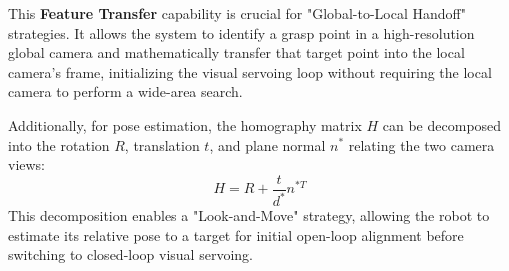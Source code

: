 This \textbf{Feature Transfer} capability is crucial for "Global-to-Local Handoff" strategies. It allows the system to identify a grasp point in a high-resolution global camera and mathematically transfer that target point into the local camera's frame, initializing the visual servoing loop without requiring the local camera to perform a wide-area search.

Additionally, for pose estimation, the homography matrix $H$ can be decomposed into the rotation $R$, translation $t$, and plane normal $n^*$ relating the two camera views:
\begin{equation}
    H = R + \frac{t}{d^*}n^{*T}
\end{equation}
This decomposition enables a "Look-and-Move" strategy, allowing the robot to estimate its relative pose to a target for initial open-loop alignment before switching to closed-loop visual servoing.